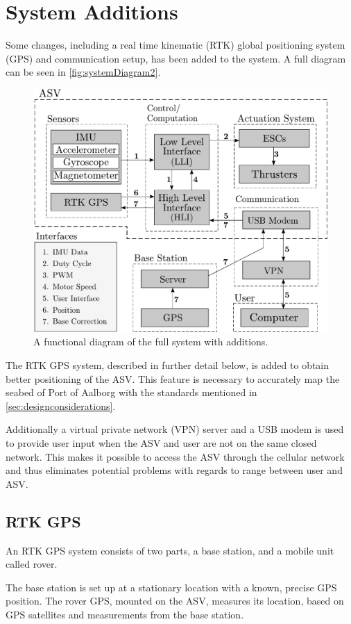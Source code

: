 \section{System Additions}
Some changes, including a real time kinematic (RTK) global positioning system (GPS) and communication setup, has been added to the system. A full diagram can be seen in \autoref{fig:systemDiagram2}.
%
\begin{figure}[H]
  \includegraphics[width=.65\textwidth]{figures/systemDiagram5}
  \caption{A functional diagram of the full system with additions.}
  \label{fig:systemDiagram2}
\end{figure}
%
The RTK GPS system, described in further detail below, is added to obtain better positioning of the ASV. This feature is necessary to accurately map the seabed of Port of Aalborg with the standards mentioned in \autoref{sec:designconsiderations}.

Additionally a virtual private network (VPN) server and a USB modem is used to provide user input when the ASV and user are not on the same closed network. This makes it possible to access the ASV through the cellular network and thus eliminates potential problems with regards to range between user and ASV.

\subsection{RTK GPS}
An RTK GPS system consists of two parts, a base station, and a  mobile unit called rover.

The base station is set up at a stationary location with a known, precise GPS position. The rover GPS, mounted on the ASV, measures its location, based on GPS satellites and measurements from the base station. \cite{EmlidRTK}

